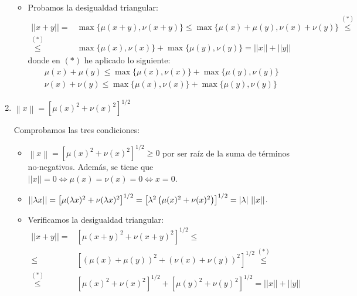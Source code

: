 \begin{ejercicio}
\begin{enumerate}
\begin{itemize}
            \item Probamos la desigualdad triangular:
            \begin{equation*}
                \begin{split}
                    ||x+y||
                    =& \max\{\mu(x+y),\nu(x+y)\}
                    \leq \max\{\mu(x)+\mu(y), \nu(x)+\nu(y)\} \stackrel{(\ast)}{\leq}\\
                    \stackrel{(\ast)}{\leq}& \max\{\mu(x), \nu(x)\} + \max\{\mu(y), \nu(y)\}
                    = ||x||+||y||
                \end{split}
            \end{equation*}
            donde en $(\ast)$ he aplicado lo siguiente:
            \begin{gather*}
                \mu(x)+\mu(y) \leq \max\{\mu(x), \nu(x)\} + \max\{\mu(y), \nu(y)\} \\
                \nu(x)+\nu(y) \leq \max\{\mu(x), \nu(x)\} + \max\{\mu(y), \nu(y)\}
            \end{gather*}
            
            
        \end{itemize}
        \item $\left\lVert x \right\rVert = \left[\mu (x)^{2} + \nu(x)^2\right]^{1/2}$
        
        Comprobamos las tres condiciones:
        \begin{itemize}
            \item $\left\lVert x \right\rVert =  \left[\mu (x)^{2} + \nu(x)^2\right]^{1/2}\geq 0$ por ser raíz de la suma de términos no-negativos. Además, se tiene que $||x||=0\Longleftrightarrow \mu(x)=\nu(x)=0\Longleftrightarrow x=0$.

            \item $||\lambda x|| =  \left[\mu (\lambda x)^{2} + \nu(\lambda x)^2\right]^{1/2} = \left[\lambda^2 \left(\mu (x)^{2} + \nu(x)^2\right)\right]^{1/2} = |\lambda|~||x||$.

            \item Verificamos la desigualdad triangular:
                \begin{equation*}
                    \begin{split}
                        ||x+y||
                        =& \left[\mu (x+y)^{2} + \nu(x+y)^2\right]^{1/2} \leq \\
                        \leq & \left[(\mu (x) + \mu(y))^2 + (\nu (x) + \nu(y))^2\right]^{1/2}
                        \stackrel{(\ast)}{\leq} \\
                        \stackrel{(\ast)}{\leq} & \left[\mu (x)^{2} + \nu(x)^2\right]^{1/2} + \left[\mu (y)^{2} + \nu(y)^2\right]^{1/2}
                        = ||x|| + ||y||
                    \end{split}
                \end{equation*}


\end{itemize}
\end{enumerate}
\end{ejercicio}
